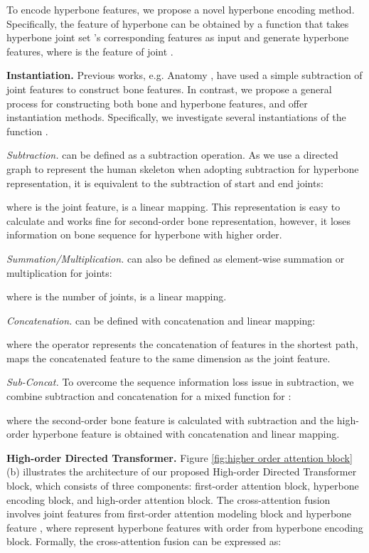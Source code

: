\documentclass{article}
\begin{document}
To encode hyperbone features, we propose a novel hyperbone encoding method. Specifically, the feature of hyperbone can be obtained by a function  that takes hyperbone joint set 's corresponding features  as input and generate hyperbone features, where  is the feature of joint .


\noindent \textbf{Instantiation.} Previous works, e.g. Anatomy \cite{chen(2021)-anatomyaware}, have used a simple subtraction of joint features to construct bone features. In contrast, we propose a general process for constructing both bone and hyperbone features, and offer instantiation methods. Specifically, we investigate several instantiations of the function .

\textit{Subtraction.}  can be defined as a subtraction operation. As we use a directed graph to represent the human skeleton when adopting subtraction for hyperbone representation, it is equivalent to the subtraction of start and end joints:

where  is the joint feature,  is a linear mapping. This representation is easy to calculate and works fine for second-order bone representation, however, it loses information on bone sequence for hyperbone with higher order.

\textit{Summation/Multiplication.}  can also be defined as element-wise summation or multiplication for joints:




\noindent where  is the number of joints,  is a linear mapping.

\textit{Concatenation.}  can be defined with concatenation and linear mapping:



\noindent where the operator  represents the concatenation of features in the shortest path,  maps the concatenated feature to the same dimension as the joint feature. 

\textit{Sub-Concat.} To overcome the sequence information loss issue in subtraction, we combine subtraction and concatenation for a mixed function for :



\noindent where the second-order bone feature is calculated with subtraction and the high-order hyperbone feature is obtained with concatenation and linear mapping.

\noindent \textbf{High-order Directed Transformer.} Figure \ref{fig:higher order attention block}(b) illustrates the architecture of our proposed High-order Directed Transformer block, which consists of three components: first-order attention block, hyperbone encoding block, and high-order attention block. The cross-attention fusion involves joint features  from first-order attention modeling block and hyperbone feature , where  represent hyperbone features with order  from hyperbone encoding block. Formally, the cross-attention fusion can be expressed as:
\end{document}
